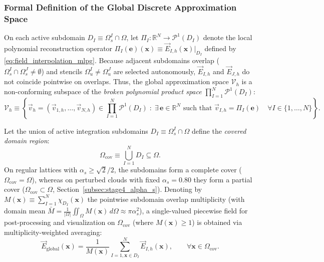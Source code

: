 \documentclass[VANCOUVER]{USG}
\begin{document}
\subsubsection{Formal Definition of the Global Discrete Approximation Space}
\label{subsubsec:discrete_space_definition}

On each active subdomain $D_I \equiv \Omega_s^I \cap \Omega$, let $\Pi_I: \mathbb{R}^N \to \mathcal{P}^1(D_I)$ denote the local polynomial reconstruction operator $\Pi_I(\mathbf{e})(\mathbf{x}) \equiv \vec{E}_{I,h}(\mathbf{x})|_{D_I}$ defined by \eqref{eq:field_interpolation_mlpg}.
Because adjacent subdomains overlap ($\Omega_s^I \cap \Omega_s^J \ne \emptyset$) and stencils $\Omega_u^I \ne \Omega_u^J$ are selected autonomously, $\vec{E}_{I,h}$ and $\vec{E}_{J,h}$ do not coincide pointwise on overlaps. Thus, the global approximation space $\mathcal{V}_h$ is a non-conforming subspace of the \emph{broken polynomial product space} $\prod_{I=1}^N \mathcal{P}^1(D_I)$:
\begin{equation}
    \mathcal{V}_h \equiv \left\{ \vec{v}_h = (\vec{v}_{1,h}, \dots, \vec{v}_{N,h}) \in \prod_{I=1}^N \mathcal{P}^1(D_I) \;:\; \exists\, \mathbf{e} \in \mathbb{R}^N \text{ such that } \vec{v}_{I,h} = \Pi_I(\mathbf{e}) \quad \forall I \in \{1, \dots, N\} \right\}.
    \label{eq:global_discrete_space_def}
\end{equation}

Let the union of active integration subdomains $D_I \equiv \Omega_s^I \cap \Omega$ define the \emph{covered domain region}:
\begin{equation}
    \Omega_{\mathrm{cov}} \equiv \bigcup_{I=1}^N D_I \subseteq \Omega.
    \label{eq:covered_region_def}
\end{equation}
On regular lattices with $\alpha_s \ge \sqrt{2}/2$, the subdomains form a complete cover ($\Omega_{\mathrm{cov}} = \Omega$), whereas on perturbed clouds with fixed $\alpha_s = 0.80$ they form a partial cover ($\Omega_{\mathrm{cov}} \subset \Omega$, Section~\ref{subsec:stage4_alpha_s}). Denoting by $M(\mathbf{x}) \equiv \sum_{I=1}^N \chi_{D_I}(\mathbf{x})$ the pointwise subdomain overlap multiplicity (with domain mean $\bar{M} = \frac{1}{|\Omega|}\iint_\Omega M(\mathbf{x})\,d\Omega \approx \pi \alpha_s^2$), a single-valued piecewise field for post-processing and visualization on $\Omega_{\mathrm{cov}}$ (where $M(\mathbf{x}) \ge 1$) is obtained via multiplicity-weighted averaging:
\begin{equation}
    \vec{E}_{\mathrm{global}}(\mathbf{x}) = \frac{1}{M(\mathbf{x})} \sum_{I=1, \mathbf{x} \in D_I}^N \vec{E}_{I,h}(\mathbf{x}), \qquad \forall \mathbf{x} \in \Omega_{\mathrm{cov}}.
    \label{eq:global_field_reconstruction}
\end{equation}
\end{document}
